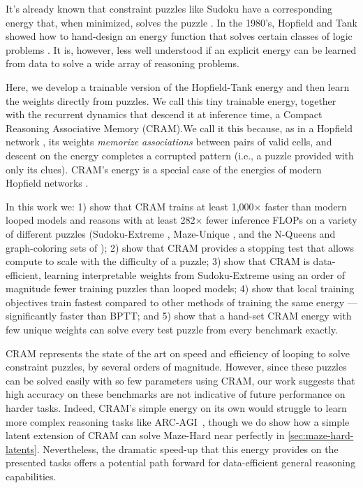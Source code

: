 \documentclass{article}
\newcommand{\CRAM}{\textsc{CRAM}}
\begin{document}
It's already known that constraint puzzles like Sudoku have a corresponding energy that, when minimized, solves the puzzle \citep{hopfieldsudoku2008}. In the 1980's, Hopfield and Tank showed how to hand-design an energy function that solves certain classes of logic problems \citep{hopfieldtank1985}. It is, however, less well understood if an explicit energy can be learned from data to solve a wide array of reasoning problems.

Here, we develop a trainable version of the Hopfield-Tank energy and then learn the weights directly from puzzles. 
We call this tiny trainable energy, together with the recurrent dynamics that descend it at inference time, a Compact Reasoning Associative Memory (\CRAM{}).We call it this because, as in a Hopfield network \citep{hopfield1982}, its weights \emph{memorize associations} between pairs of valid cells, and descent on the energy completes a corrupted pattern (i.e., a puzzle provided with only its clues).
\CRAM{}'s energy is a special case of the energies of modern Hopfield networks \citep{denseam2016,amtutorial2025}. 

In this work we: 1) show that \CRAM{} trains at least 1,000${\times}$ faster than modern looped models and reasons with at least 282${\times}$ fewer inference FLOPs on a variety of different puzzles (Sudoku-Extreme \citep{hrm2025}, Maze-Unique \citep{eqr2026}, and the N-Queens and graph-coloring sets of \citet{gram2026}); 2) show that \CRAM{} provides a stopping test that allows compute to scale with the difficulty of a puzzle;  3) show that \CRAM{} is data-efficient, learning interpretable weights from Sudoku-Extreme using an order of magnitude fewer training puzzles than looped models; 4) show that local training objectives train fastest compared to other methods of training the same energy --- significantly faster than BPTT; and 5) show that a hand-set \CRAM{} energy with few unique weights can solve every test puzzle from every benchmark exactly.  

\CRAM{} represents the state of the art on speed and efficiency of looping to solve constraint puzzles, by several orders of magnitude. 
However, since these puzzles can be solved easily with so few parameters using \CRAM{}, our work suggests that high accuracy on these benchmarks are not indicative of future performance on harder tasks.
Indeed, \CRAM{}'s simple energy on its own would struggle to learn more complex reasoning tasks like ARC-AGI~\cite{chollet2019}, though we do show how a simple latent extension of \CRAM{} can solve Maze-Hard near perfectly in \cref{sec:maze-hard-latents}. 
Nevertheless, the dramatic speed-up that this energy provides on the presented tasks offers a potential path forward for data-efficient general reasoning capabilities.
\end{document}
